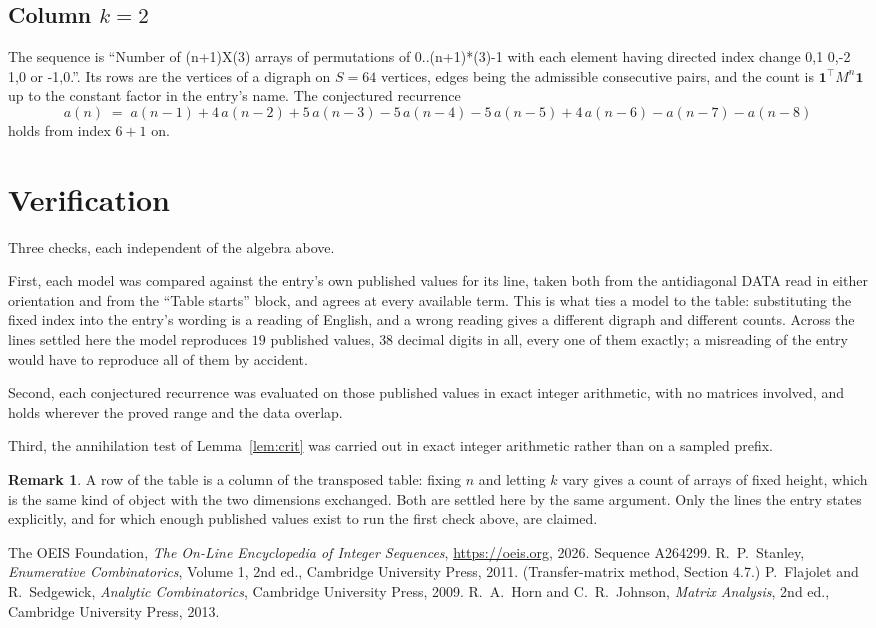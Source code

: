 \documentclass[11pt,a4paper]{article}
\theoremstyle{plain}
\theoremstyle{definition}
\newtheorem{remark}[theorem]{Remark}
\begin{document}
\subsection*{Column $k$$=2$}
The sequence is ``Number of (n+1)X(3) arrays of permutations of 0..(n+1)*(3)-1 with each element having directed index change 0,1 0,-2 1,0 or -1,0.''. Its rows are the vertices of a digraph on
$S=64$ vertices, edges being the admissible consecutive pairs, and the count is
$\mathbf{1}^{\!\top}M^{n}\mathbf{1}$ up to the constant factor in the entry's name.
The conjectured recurrence
\[
a(n)\;=\;a(n-1) + 4\,a(n-2) + 5\,a(n-3) - 5\,a(n-4) - 5\,a(n-5) + 4\,a(n-6) - a(n-7) - a(n-8)
\]
holds from index $6+1$ on.

\section{Verification}

Three checks, each independent of the algebra above.

First, each model was compared against the entry's own published values for its line, taken
both from the antidiagonal DATA read in either orientation and from the ``Table starts''
block, and agrees at every available term. This is what ties a model to the table:
substituting the fixed index into the entry's wording is a reading of English, and a wrong
reading gives a different digraph and different counts. Across the lines settled here the
model reproduces $19$ published values, $38$ decimal digits in all, every one of
them exactly; a misreading of the entry would have to reproduce all of them by accident.

Second, each conjectured recurrence was evaluated on those published values in exact
integer arithmetic, with no matrices involved, and holds wherever the proved range and the
data overlap.

Third, the annihilation test of Lemma~\ref{lem:crit} was carried out in exact integer
arithmetic rather than on a sampled prefix.

\begin{remark}
A row of the table is a column of the transposed table: fixing $n$ and letting $k$ vary gives a
count of arrays of fixed height, which is the same kind of object with the two dimensions
exchanged. Both are settled here by the same argument. Only the lines the entry states
explicitly, and for which enough published values exist to run the first check above, are
claimed.
\end{remark}

\begin{thebibliography}{9}
 The OEIS Foundation, \emph{The On-Line Encyclopedia of Integer
Sequences}, \url{https://oeis.org}, 2026. Sequence A264299.
 R.~P.~Stanley, \emph{Enumerative Combinatorics}, Volume 1, 2nd ed.,
Cambridge University Press, 2011. (Transfer-matrix method, Section 4.7.)
 P.~Flajolet and R.~Sedgewick, \emph{Analytic Combinatorics}, Cambridge
University Press, 2009.
 R.~A.~Horn and C.~R.~Johnson, \emph{Matrix Analysis}, 2nd ed., Cambridge
University Press, 2013.
\end{thebibliography}
\end{document}
